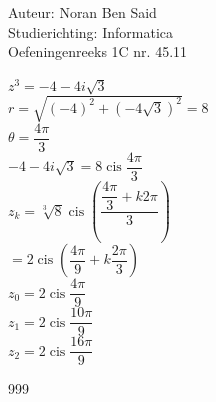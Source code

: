 \documentclass[a4paper]{article}
\begin{document}
\noindent \large Auteur: Noran Ben Said \\
\noindent \large Studierichting: Informatica\\
\noindent \large Oefeningenreeks 1C nr. 45.11\\

\medskip
\normalsize

$z^3 = -4 - 4i\sqrt{3}$\\

$r = \sqrt{(-4)^2 + (-4\sqrt{3})^2} = 8$\\

$\theta = \dfrac{4\pi}{3}$\\

$-4 - 4i\sqrt{3} = 8 \operatorname{cis} \dfrac{4\pi}{3}$\\

$ z_k = \sqrt[3]{8} \operatorname{cis}\left( \dfrac{\dfrac{4\pi}{3} + k2\pi}{3} \right)$\\

$= 2 \operatorname{cis} \left( \dfrac{4\pi}{9} + k\dfrac{2\pi}{3} \right)$\\

$z_0 = 2 \operatorname{cis} \dfrac{4\pi}{9}$\\

$z_1 = 2 \operatorname{cis} \dfrac{10\pi}{9}$\\

$z_2 = 2 \operatorname{cis} \dfrac{16\pi}{9}$\\



\begin{thebibliography}{999}
\end{thebibliography}
\end{document}
